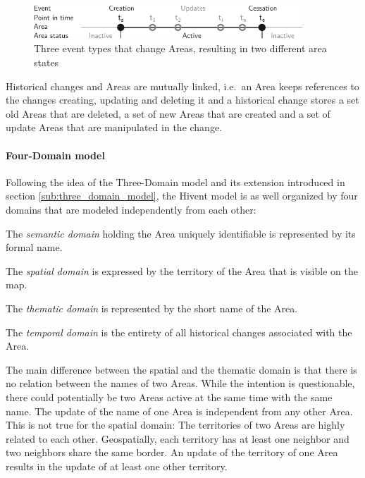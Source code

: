 \begin{figure}[H]
  \vspace{1em}
  \centering
  \includegraphics[width=0.9\textwidth]{graphics/development/hivent_model/area_states}
  \caption{Three event types that change Areas, resulting in two different area states}
  \label{fig:area_states}
\end{figure}

Historical changes and Areas are mutually linked, i.e.\ an Area keeps references to the changes creating, updating and deleting it and a historical change stores a set old Areas that are deleted, a set of new Areas that are created and a set of update Areas that are manipulated in the change.


\paragraph{Four-Domain model} %
\label{par:four_domain_model}

Following the idea of the Three-Domain model and its extension introduced in section \ref{sub:three_domain_model}, the Hivent model is as well organized by four domains that are modeled independently from each other:

\begin{compactitem}
  \item The \emph{semantic domain} holding the Area uniquely identifiable is represented by its formal name.
  \item The \emph{spatial domain} is expressed by the territory of the Area that is visible on the map.
  \item The \emph{thematic domain} is represented by the short name of the Area.
  \item The \emph{temporal domain} is the entirety of all historical changes associated with the Area.
\end{compactitem}

The main difference between the spatial and the thematic domain is that there is no relation between the names of two Areas. While the intention is questionable, there could potentially be two Areas active at the same time with the same name. The update of the name of one Area is independent from any other Area. This is not true for the spatial domain: The territories of two Areas are highly related to each other. Geospatially, each territory has at least one neighbor and two neighbors share the same border. An update of the territory of one Area results in the update of at least one other territory.


